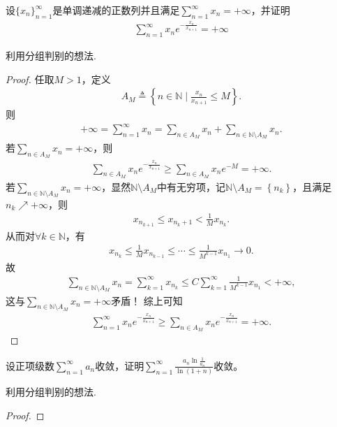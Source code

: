\documentclass[../../main.tex]{subfiles}
\begin{document}
\begin{example}
设$\{ x_n \}_{n=1}^{\infty}$是单调递减的正数列并且满足$\sum_{n=1}^{\infty} x_n = +\infty$，并证明
\begin{align*}
\sum_{n=1}^{\infty} x_n e^{-\frac{x_n}{x_{n+1}}} = +\infty
\end{align*}
\end{example}
\begin{note}
利用分组判别的想法.
\end{note}
\begin{proof}
任取$M>1$，定义
\begin{align*}
A_M\triangleq \left\{ n\in \mathbb{N} \mid \frac{x_n}{x_{n+1}}\leqslant M \right\} .
\end{align*}
则
\begin{align*}
+\infty =\sum_{n=1}^{\infty}{x_n}=\sum_{n\in A_M}{x_n}+\sum_{n\in \mathbb{N} \setminus A_M}{x_n}.
\end{align*}
若$\sum_{n\in A_M}{x_n}=+\infty$，则
\begin{align*}
\sum_{n\in A_M}{x_ne^{-\frac{x_n}{x_{n+1}}}}\geqslant \sum_{n\in A_M}{x_ne^{-M}}=+\infty .
\end{align*}
若$\sum_{n\in \mathbb{N} \setminus A_M}{x_n}=+\infty$，显然$\mathbb{N} \setminus A_M$中有无穷项，记$\mathbb{N} \setminus A_M=\left\{ n_k \right\}$，且满足$n_k\nearrow +\infty$，则
\begin{align*}
x_{n_{k+1}}\leqslant x_{n_k+1}<\frac{1}{M}x_{n_k}.
\end{align*}
从而对$\forall k\in \mathbb{N}$，有
\begin{align*}
x_{n_k}\leqslant \frac{1}{M}x_{n_{k-1}}\leqslant \cdots \leqslant \frac{1}{M^{k-1}}x_{n_1}\rightarrow 0.
\end{align*}
故
\begin{align*}
\sum_{n\in \mathbb{N} \setminus A_M}{x_n}=\sum_{k=1}^{\infty}{x_{n_k}}\leqslant C\sum_{k=1}^{\infty}{\frac{1}{M^{k-1}}x_{n_1}}<+\infty ,
\end{align*}
这与$\sum_{n\in \mathbb{N} \setminus A_M}{x_n}=+\infty$矛盾！
综上可知
\begin{align*}
\sum_{n=1}^{\infty}{x_ne^{-\frac{x_n}{x_{n+1}}}}\geqslant \sum_{n\in A_M}{x_ne^{-\frac{x_n}{x_{n+1}}}}=+\infty .
\end{align*}
\end{proof}

\begin{example}
设正项级数$\sum_{n=1}^{\infty} a_n$收敛，证明$\sum_{n=1}^{\infty} \frac{a_n \ln \frac{1}{a_n}}{\ln (1 + n)}$收敛。
\end{example}
\begin{note}
利用分组判别的想法.
\end{note}
\begin{proof}

\end{proof}
\end{document}

